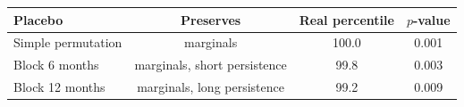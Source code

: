 \begin{tabular}{lccc}
\toprule
Placebo & Preserves & Real percentile & $p$-value \\
\midrule
Simple permutation & marginals & 100.0 & 0.001 \\
Block 6 months & marginals, short persistence & 99.8 & 0.003 \\
Block 12 months & marginals, long persistence & 99.2 & 0.009 \\
\bottomrule
\end{tabular}
